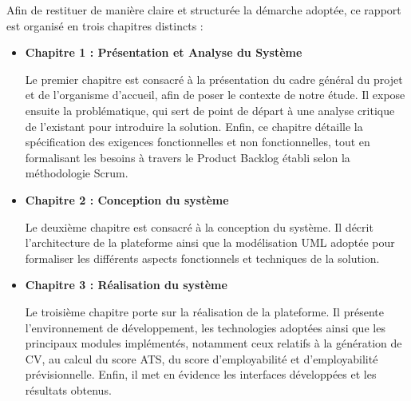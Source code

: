\vspace{12pt}

\noindent Afin de restituer de manière claire et structurée la démarche adoptée, ce rapport est organisé en trois chapitres distincts :

\begin{itemize}[leftmargin=*]
  \item \textbf{Chapitre 1 : Présentation et Analyse du Système}
  
  \noindent Le premier chapitre est consacré à la présentation du cadre général du projet et de l'organisme d'accueil, afin de poser le contexte de notre étude. Il expose ensuite la problématique, qui sert de point de départ à une analyse critique de l'existant pour introduire la solution. Enfin, ce chapitre détaille la spécification des exigences fonctionnelles et non fonctionnelles, tout en formalisant les besoins à travers le Product Backlog établi selon la méthodologie Scrum.
  \item \textbf{Chapitre 2 : Conception du système} 

  \noindent Le deuxième chapitre est consacré à la conception du système. Il décrit l'architecture de la plateforme ainsi que la modélisation UML adoptée pour formaliser les différents aspects fonctionnels et techniques de la solution.
  \item \textbf{Chapitre 3 : Réalisation du système} 
  
  \noindent Le troisième chapitre porte sur la réalisation de la plateforme. Il présente l'environnement de développement, les technologies adoptées ainsi que les principaux modules implémentés, notamment ceux relatifs à la génération de CV, au calcul du score ATS, du score d'employabilité et d'employabilité prévisionnelle. Enfin, il met en évidence les interfaces développées et les résultats obtenus.
\end{itemize}

\vspace{12pt}
